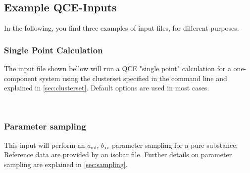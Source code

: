\documentclass{scrartcl}
\newcommand{\amf}{a_\mathrm{mf}}
\newcommand{\bxv}{b_\mathrm{xv}}
\begin{document}
\newpage
\subsection*{Example QCE-Inputs}
\vspace{-0.3cm}
In the following, you find three examples of input files, for different purposes.

\subsubsection*{Single Point Calculation}\vspace{-0.3cm}
The input file shown bellow will run a QCE "single point" calculation for a one-component system 
using the clusterset specified in the command line and explained in \cref{sec:clusterset}.
Default options are used in most cases.

\
\noindent{}
\

\subsubsection*{Parameter sampling}\vspace{-0.3cm}
This input will perform an $\amf$, $\bxv$ parameter sampling for a pure substance.
Reference data are provided by an isobar file.
Further details on parameter sampling are explained in \cref{sec:sampling}.
\end{document}
